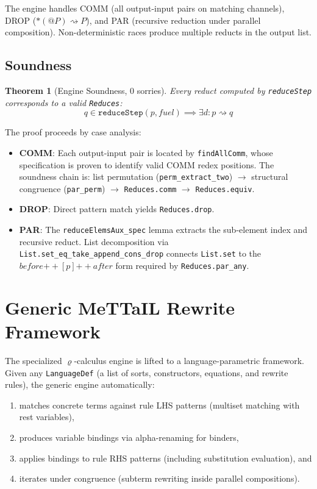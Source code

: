 \documentclass[]{article}
\newtheorem{theorem}{Theorem}
\newcommand{\code}[1]{\texttt{#1}}
\newcommand{\rhocalc}{\ensuremath{\varrho}}
\begin{document}
The engine handles COMM (all output-input pairs on matching channels), DROP
($*(@P) \rightsquigarrow P$), and PAR (recursive reduction under parallel composition).
Non-deterministic races produce multiple reducts in the output list.

\subsection{Soundness}

\begin{theorem}[Engine Soundness, 0 sorries]
Every reduct computed by \code{reduceStep} corresponds to a valid \code{Reduces}:
$$q \in \code{reduceStep}(p, \mathit{fuel}) \implies \exists d : p \rightsquigarrow q$$
\end{theorem}

The proof proceeds by case analysis:
\begin{itemize}
\item \textbf{COMM}: Each output-input pair is located by \code{findAllComm}, whose
  specification is proven to identify valid COMM redex positions.  The soundness chain
  is: list permutation (\code{perm\_extract\_two}) $\to$ structural congruence
  (\code{par\_perm}) $\to$ \code{Reduces.comm} $\to$ \code{Reduces.equiv}.
\item \textbf{DROP}: Direct pattern match yields \code{Reduces.drop}.
\item \textbf{PAR}: The \code{reduceElemsAux\_spec} lemma extracts the sub-element
  index and recursive reduct.  List decomposition via
  \code{List.set\_eq\_take\_append\_cons\_drop} connects \code{List.set} to the
  $\mathit{before} \mathbin{+\!\!+} [p] \mathbin{+\!\!+} \mathit{after}$ form
  required by \code{Reduces.par\_any}.
\end{itemize}

\section{Generic MeTTaIL Rewrite Framework}

The specialized \rhocalc{}-calculus engine is lifted to a language-parametric
framework.  Given any \code{LanguageDef} (a list of sorts, constructors, equations,
and rewrite rules), the generic engine automatically:
\begin{enumerate}
\item matches concrete terms against rule LHS patterns (multiset matching with rest variables),
\item produces variable bindings via alpha-renaming for binders,
\item applies bindings to rule RHS patterns (including substitution evaluation), and
\item iterates under congruence (subterm rewriting inside parallel compositions).
\end{enumerate}
\end{document}
